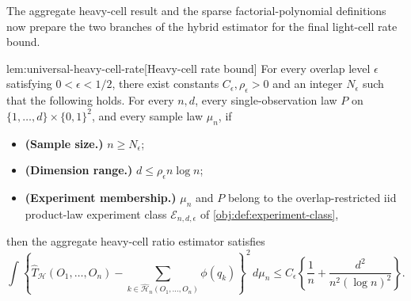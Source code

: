 \documentclass[11pt]{article}
\begin{document}
The aggregate heavy-cell result and the sparse factorial-polynomial definitions now prepare the two branches of the hybrid estimator for the final light-cell rate bound.

\begin{lemmav}{lem:universal-heavy-cell-rate}[Heavy-cell rate bound]
For every overlap level \(\epsilon\) satisfying \(0<\epsilon<1/2\), there exist constants \(C_\epsilon,\rho_\epsilon>0\) and an integer \(N_\epsilon\) such that the following holds. For every \(n,d\), every single-observation law \(P\) on \(\{1,\ldots,d\}\times\{0,1\}^2\), and every sample law \(\mu_n\), if
\begin{itemize}
\item \textbf{(Sample size.)} \(n\ge N_\epsilon\);
\item \textbf{(Dimension range.)} \(d\le \rho_\epsilon n\log n\);
\item \textbf{(Experiment membership.)} \(\mu_n\) and \(P\) belong to the overlap-restricted iid product-law experiment class \(\mathcal E_{n,d,\epsilon}\) of \cref{obj:def:experiment-class},
\end{itemize}
then the aggregate heavy-cell ratio estimator satisfies
\[
\int \left\{
\widehat T_{\mathcal H}(O_1,\ldots,O_n)
-
\sum_{k\in\widehat{\mathcal H}_n(O_1,\ldots,O_n)} \phi(q_k)
\right\}^2\,d\mu_n
\le
C_\epsilon\left\{
\frac1n+\frac{d^2}{n^2(\log n)^2}
\right\}.
\]
\end{lemmav}
\end{document}
